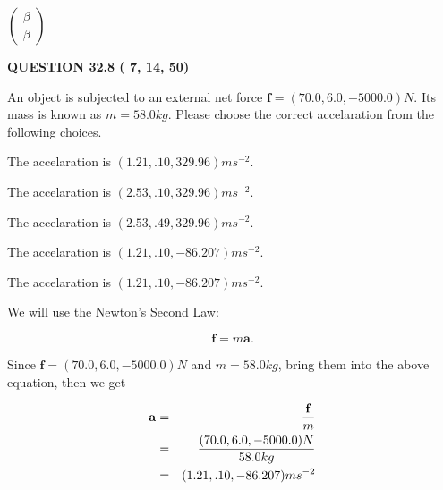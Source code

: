 \documentclass[12pt]{article}
\begin{document}
   
 $  \left( \begin{array}
 {
 c
 }
 \beta \\ 
 \beta
 \end{array} \right) $ 
  
\vspace{0.2in}
  
{\textbf{\Large{QUESTION
32.8 
 (          7,         14,         50)
}}}
  
  
 
An object is subjected to an external net force $\mathbf{f}=
(70.0 , 6.0 , -5000.0) N$.
Its mass is known as $m= %
58.0 kg$.
Please choose the correct accelaration from the following choices.
 
 
  The accelaration is $  %
(
1.21,
.10,
329.96)
ms^{-2} $.
 
 
  The accelaration is $  %
(
2.53,
.10,
329.96)
ms^{-2} $.
 
 
  The accelaration is $  %
(
2.53,
.49,
329.96)
ms^{-2} $.
 
 
  The accelaration is $  %
(
1.21,
.10,
-86.207)
ms^{-2} $.
 
 
\noindent{}
 
 
  The accelaration is $  %
(
1.21,
.10,
-86.207)
ms^{-2} $.
 
 
\noindent{}
 
 
 
 
 
\noindent{}
 
 

We will use the Newton's Second Law:
 
\[
\mathbf{f}=m\mathbf{a}.
\]
 
Since $\mathbf{f}= %
(70.0 , 6.0 , -5000.0) N$
and $m= %
58.0kg$, bring them into the above equation, then we get
 
\begin{eqnarray*}
\mathbf{a}&=&\frac{\mathbf{f}}m  \\
&=&\frac{ %
(70.0 , 6.0 , -5000.0) N}{ %
58.0kg}  \\
&=& %
(1.21 , .10 , -86.207) ms^{-2}
\end{eqnarray*}
 
\end{document}
